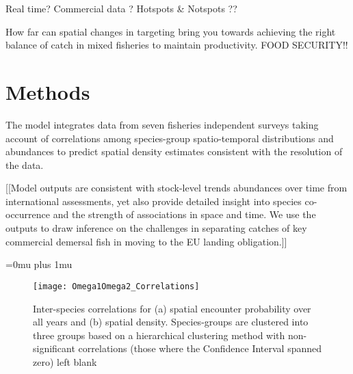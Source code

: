 \documentclass{nature}
\begin{document}
\begin{linenumbers}
Real time?  Commercial data ?  Hotspots \& Notspots ??

How far can spatial changes in targeting bring you towards achieving the right
balance of catch in mixed fisheries to maintain productivity. FOOD SECURITY!!

\section*{Methods}

The model integrates data from seven fisheries independent surveys taking
account of correlations among species-group spatio-temporal distributions and
abundances to predict spatial density estimates consistent with the resolution
of the data. 

[[Model outputs are consistent with stock-level trends abundances over time
from international assessments, yet also provide detailed insight into species
co-occurrence and the strength of associations in space and time.  We use the
outputs to draw inference on the challenges in separating catches of key
commercial demersal fish in moving to the EU landing obligation.]]



\end{linenumbers}
\newpage
\Urlmuskip=0mu plus 1mu\relax

\small{}





\begin{figure}
\begin{center}
	\texttt{[image: Omega1Omega2\_Correlations]}
	\label{fig:1}
	\caption{Inter-species correlations for (a) spatial encounter
		probability over all years and (b) spatial density.
		Species-groups are clustered into three groups based on a
		hierarchical clustering method with non-significant
		correlations (those where the Confidence Interval spanned zero)
		left blank}
\end{center}
\end{figure}
\end{document}
